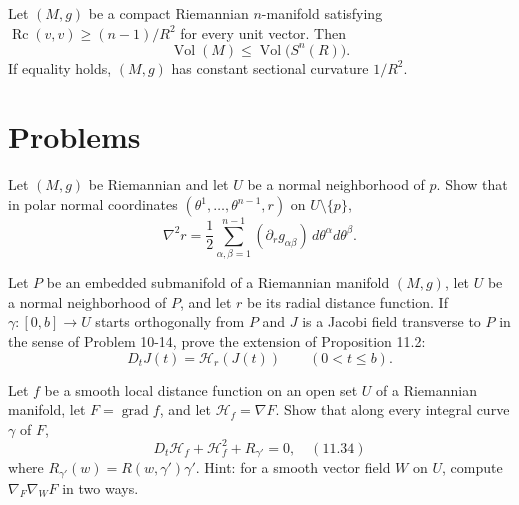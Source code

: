\begin{corollary}
\label{cor:ricci-volume-comparison}

Let $(M,g)$ be a compact Riemannian $n$-manifold satisfying
$\operatorname{Rc}(v,v)\geq(n-1)/R^2$ for every unit vector. Then
\[
\operatorname{Vol}(M)
\leq\operatorname{Vol}\bigl(S^n(R)\bigr).
\]
If equality holds, $(M,g)$ has constant sectional curvature $1/R^2$.
\end{corollary}
\section{Problems}

\begin{exercise}
\label{prob:hessian-polar-coordinates}

Let $(M,g)$ be Riemannian and let $U$ be a normal neighborhood of $p$.  Show
that in polar normal coordinates
$(\theta^1,\ldots,\theta^{n-1},r)$ on $U\setminus\{p\}$,
\[
\nabla^2r=\frac12\sum_{\alpha,\beta=1}^{n-1}
(\partial_rg_{\alpha\beta})\,d\theta^\alpha d\theta^\beta.
\]
\end{exercise}

\begin{exercise}
\label{prob:jacobi-field-submanifold}

Let $P$ be an embedded submanifold of a Riemannian manifold $(M,g)$, let
$U$ be a normal neighborhood of $P$, and let $r$ be its radial distance
function.  If $\gamma:[0,b]\to U$ starts orthogonally from $P$ and $J$ is a
Jacobi field transverse to $P$ in the sense of Problem 10-14, prove the
extension of Proposition 11.2:
\[
D_tJ(t)=\mathcal H_r(J(t))\qquad(0<t\leq b).
\]
\end{exercise}

\begin{exercise}
\label{prob:riccati-equation}

Let $f$ be a smooth local distance function on an open set $U$ of a Riemannian
manifold, let $F=\operatorname{grad}f$, and let $\mathcal H_f=\nabla F$.  Show
that along every integral curve $\gamma$ of $F$,
\[
D_t\mathcal H_f+\mathcal H_f^2+R_{\gamma'}=0, \quad (11.34)
\]
where $R_{\gamma'}(w)=R(w,\gamma')\gamma'$.  Hint: for a smooth vector field
$W$ on $U$, compute $\nabla_F\nabla_WF$ in two ways.
\end{exercise}

